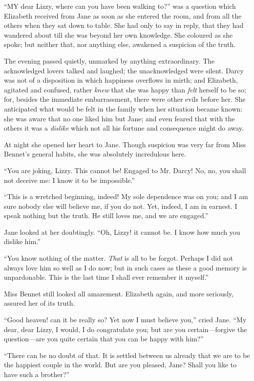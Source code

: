 \documentclass[12pt,openright]{book}
\begin{document}
\noindent  “MY dear Lizzy, where can you have been walking to?” was a question which Elizabeth received from Jane as soon as she entered the room, and from all the others when they sat down to table. She had only to say in reply, that they had wandered about till she was beyond her own knowledge. She coloured as she spoke; but neither that, nor anything else, awakened a suspicion of the truth.

The evening passed quietly, unmarked by anything extraordinary. The acknowledged lovers talked and laughed; the unacknowledged were silent. Darcy was not of a disposition in which happiness overflows in mirth; and Elizabeth, agitated and confused, rather \textit{knew} that she was happy than \textit{felt} herself to be so; for, besides the immediate embarrassment, there were other evils before her. She anticipated what would be felt in the family when her situation became known: she was aware that no one liked him but Jane; and even feared that with the others it was a \textit{dislike} which not all his fortune and consequence might do away.

At night she opened her heart to Jane. Though suspicion was very far from Miss Bennet’s general habits, she was absolutely incredulous here.

“You are joking, Lizzy. This cannot be! Engaged to Mr. Darcy! No, no, you shall not deceive me: I know it to be impossible.”

“This is a wretched beginning, indeed! My sole dependence was on you; and I am sure nobody else will believe me, if you do not. Yet, indeed, I am in earnest. I speak nothing but the truth. He still loves me, and we are engaged.”

Jane looked at her doubtingly. “Oh, Lizzy! it cannot be. I know how much you dislike him.”

“You know nothing of the matter. \textit{That} is all to be forgot. Perhaps I did not always love him so well as I do now; but in such cases as these a good memory is unpardonable. This is the last time I shall ever remember it myself.”

Miss Bennet still looked all amazement. Elizabeth again, and more seriously, assured her of its truth.

“Good heaven! can it be really so? Yet now I must believe you,” cried Jane. “My dear, dear Lizzy, I would, I do congratulate you; but are you certain—forgive the question—are you quite certain that you can be happy with him?”

“There can be no doubt of that. It is settled between us already that we are to be the happiest couple in the world. But are you pleased, Jane? Shall you like to have such a brother?”
\end{document}
